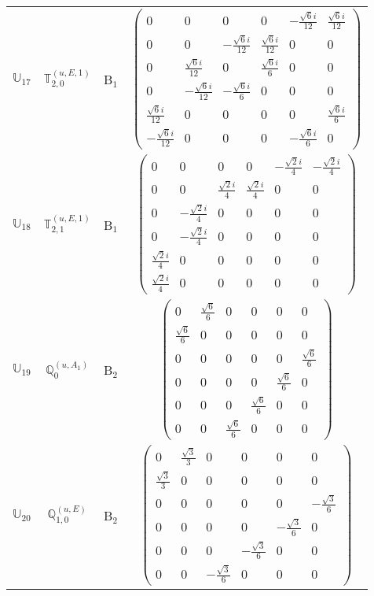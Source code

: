 \documentclass[fleqn,10pt,landscape]{article}
\begin{document}
\begin{itemize}
\begin{center}
\begin{longtable}{c|c|c|c}
$ \mathbb{U}_{17} $ & $\mathbb{T}_{2,0}^{(u,E,1)}$ & B$_{1}$ & $\begin{pmatrix} 0 & 0 & 0 & 0 & - \frac{\sqrt{6} i}{12} & \frac{\sqrt{6} i}{12} \\ 0 & 0 & - \frac{\sqrt{6} i}{12} & \frac{\sqrt{6} i}{12} & 0 & 0 \\ 0 & \frac{\sqrt{6} i}{12} & 0 & \frac{\sqrt{6} i}{6} & 0 & 0 \\ 0 & - \frac{\sqrt{6} i}{12} & - \frac{\sqrt{6} i}{6} & 0 & 0 & 0 \\ \frac{\sqrt{6} i}{12} & 0 & 0 & 0 & 0 & \frac{\sqrt{6} i}{6} \\ - \frac{\sqrt{6} i}{12} & 0 & 0 & 0 & - \frac{\sqrt{6} i}{6} & 0 \end{pmatrix}$ \\
$ \mathbb{U}_{18} $ & $\mathbb{T}_{2,1}^{(u,E,1)}$ & B$_{1}$ & $\begin{pmatrix} 0 & 0 & 0 & 0 & - \frac{\sqrt{2} i}{4} & - \frac{\sqrt{2} i}{4} \\ 0 & 0 & \frac{\sqrt{2} i}{4} & \frac{\sqrt{2} i}{4} & 0 & 0 \\ 0 & - \frac{\sqrt{2} i}{4} & 0 & 0 & 0 & 0 \\ 0 & - \frac{\sqrt{2} i}{4} & 0 & 0 & 0 & 0 \\ \frac{\sqrt{2} i}{4} & 0 & 0 & 0 & 0 & 0 \\ \frac{\sqrt{2} i}{4} & 0 & 0 & 0 & 0 & 0 \end{pmatrix}$ \\ \hline
$ \mathbb{U}_{19} $ & $\mathbb{Q}_{0}^{(u,A_{1})}$ & B$_{2}$ & $\begin{pmatrix} 0 & \frac{\sqrt{6}}{6} & 0 & 0 & 0 & 0 \\ \frac{\sqrt{6}}{6} & 0 & 0 & 0 & 0 & 0 \\ 0 & 0 & 0 & 0 & 0 & \frac{\sqrt{6}}{6} \\ 0 & 0 & 0 & 0 & \frac{\sqrt{6}}{6} & 0 \\ 0 & 0 & 0 & \frac{\sqrt{6}}{6} & 0 & 0 \\ 0 & 0 & \frac{\sqrt{6}}{6} & 0 & 0 & 0 \end{pmatrix}$ \\
$ \mathbb{U}_{20} $ & $\mathbb{Q}_{1,0}^{(u,E)}$ & B$_{2}$ & $\begin{pmatrix} 0 & \frac{\sqrt{3}}{3} & 0 & 0 & 0 & 0 \\ \frac{\sqrt{3}}{3} & 0 & 0 & 0 & 0 & 0 \\ 0 & 0 & 0 & 0 & 0 & - \frac{\sqrt{3}}{6} \\ 0 & 0 & 0 & 0 & - \frac{\sqrt{3}}{6} & 0 \\ 0 & 0 & 0 & - \frac{\sqrt{3}}{6} & 0 & 0 \\ 0 & 0 & - \frac{\sqrt{3}}{6} & 0 & 0 & 0 \end{pmatrix}$ \\

\end{longtable}
\end{center}
\end{itemize}
\end{document}

